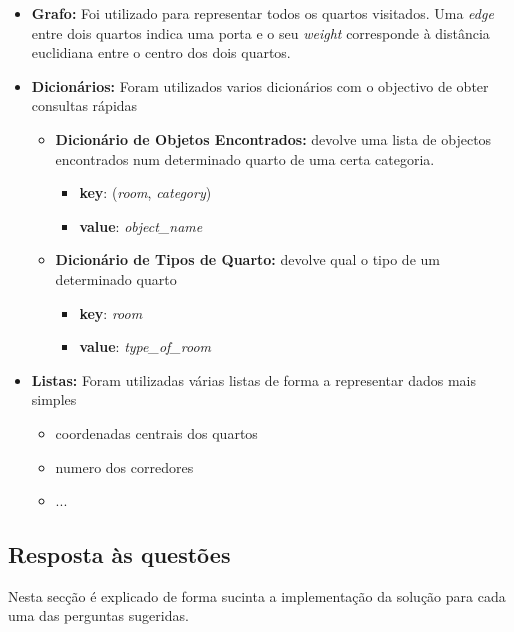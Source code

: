 \begin{itemize}
    \item \textbf{Grafo:} Foi utilizado para representar todos os quartos visitados. Uma \textit{edge} entre dois quartos indica uma porta e o seu \textit{weight} corresponde à distância euclidiana entre o centro dos dois quartos.
    \item \textbf{Dicionários:} Foram utilizados varios dicionários com o objectivo de obter consultas rápidas
    \begin{itemize}
        \item \textbf{Dicionário de Objetos Encontrados:} devolve uma lista de objectos encontrados num determinado quarto de uma certa categoria.
        \begin{itemize}
            \item \textbf{key}: (\textit{room}, \textit{category})
            \item \textbf{value}: \textit{object\_name}
        \end{itemize}
        \item \textbf{Dicionário de Tipos de Quarto:} devolve qual o tipo de um determinado quarto
        \begin{itemize}
            \item \textbf{key}: \textit{room}
            \item \textbf{value}: \textit{type\_of\_room}
        \end{itemize}
    \end{itemize}
    \item \textbf{Listas:} Foram utilizadas várias listas de forma a representar dados mais simples
    \begin{itemize}
      \item coordenadas centrais dos quartos
      \item numero dos corredores
      \item ...
    \end{itemize}
\end{itemize}

\clearpage
\subsection{Resposta às questões}
\label{chap2:sec:resposta}

Nesta secção é explicado de forma sucinta a implementação da solução para cada uma das perguntas sugeridas.
















